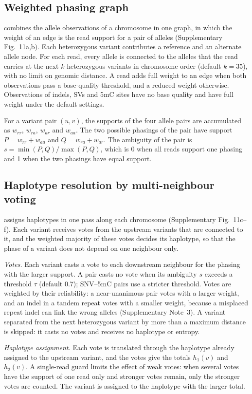 \subsection*{Weighted phasing graph}
\toolname combines the allele observations of a chromosome in one graph, in which the weight of an edge is the read support for a pair of alleles (Supplementary Fig.~11a,b).  Each heterozygous variant contributes a reference and an alternate allele node.  For each read, every allele is connected to the alleles that the read carries at the next $k$ heterozygous variants in chromosome order (default $k=35$), with no limit on genomic distance.  A read adds full weight to an edge when both observations pass a base-quality threshold, and a reduced weight otherwise.  Observations of indels, SVs and 5mC sites have no base quality and have full weight under the default settings.

For a variant pair $(u,v)$, the supports of the four allele pairs are accumulated as $w_{rr}$, $w_{ra}$, $w_{ar}$ and $w_{aa}$.  The two possible phasings of the pair have support $P=w_{rr}+w_{aa}$ and $Q=w_{ra}+w_{ar}$.  The ambiguity of the pair is $s=\min(P,Q)/\max(P,Q)$, which is 0 when all reads support one phasing and 1 when the two phasings have equal support.
\subsection*{Haplotype resolution by multi-neighbour voting}
\toolname assigns haplotypes in one pass along each chromosome (Supplementary Fig.~11c--f).  Each variant receives votes from the upstream variants that are connected to it, and the weighted majority of these votes decides its haplotype, so that the phase of a variant does not depend on one neighbour only.

\emph{Votes.}  Each variant casts a vote to each downstream neighbour for the phasing with the larger support.  A pair casts no vote when its ambiguity $s$ exceeds a threshold $\tau$ (default 0.7); SNV--5mC pairs use a stricter threshold.  Votes are weighted by their reliability: a near-unanimous pair votes with a larger weight, and an indel in a tandem repeat votes with a smaller weight, because a misplaced repeat indel can link the wrong alleles (Supplementary Note~3).  A variant separated from the next heterozygous variant by more than a maximum distance is skipped: it casts no votes and receives no haplotype or entropy.

\emph{Haplotype assignment.}  Each vote is translated through the haplotype already assigned to the upstream variant, and the votes give the totals $h_1(v)$ and $h_2(v)$.  A single-read guard limits the effect of weak votes: when several votes have the support of one read only and stronger votes remain, only the stronger votes are counted.  The variant is assigned to the haplotype with the larger total.

